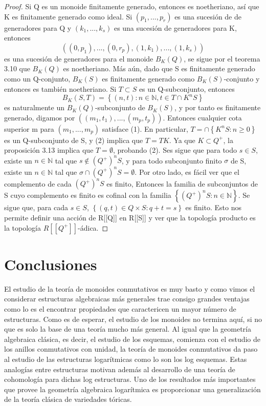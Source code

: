 \documentclass[12pt,spanish]{amsart}
\newcommand{\bb}[1]{\mathbb{#1}}
\newcommand{\set}[1]{\left\{{#1}\right\}}
\theoremstyle{definition}
\theoremstyle{remark}
\begin{document}
\begin{proof}
 Si Q es un monoide finitamente generado, entonces es noetheriano, así que K es finitamente generado como ideal. Si $(p_{1},...,p_{r})$ es una sucesión de de generadores para Q y $(k_{1},...,k_{s})$  es una sucesión de generadores para K, entonces
 $$((0,p_{1}),...,(0,r_{p}),(1,k_{1}),...,(1,k_{s}))$$
 es una sucesión de generadores para el monoide $B_{K}(Q)$, se sigue por el teorema 3.10 que $B_{K}(Q)$ es noetheriano. Más aún, dado que S es finitamente generado como un Q-conjunto, $B_{K}(S)$ es finitamente generado como $B_{K}(S)$-conjunto y entonces es también noetheriano. Si $T \subset S$ es un Q-subconjunto, entonces 
 $$B_{K}(S,T)=\set{(n,t):n\in  \bb{N}, t\in T \cap K^{n}S}$$
 es naturalmente un $B_{K}(Q)$-subconjunto de $B_{K}(S)$, y por tanto es finitamente generado, digamos por $((m_{1},t_{1}),...,(m_{p},t_{p}))$. Entonces cualquier cota superior m para $(m_{1},...,m_{p})$ satisface (1). En particular, $T=\cap \set{K^{n}S:n\geq 0}$ es un Q-subconjunto de S, y (2) implica que $T=TK$. Ya que $K\subset Q^{+}$, la proposición 3.13 implica que $T=\emptyset$, probando (2). Ses sigue que para todo $s\in S$, existe un $n\in \bb{N}$ tal que $s\notin (Q^{+})^{n}S$, y para todo subconjunto finito $\sigma$ de S, existe un $n\in \bb{N}$ tal que $\sigma \cap (Q^{+})^{n}S= \emptyset$. Por otro lado, es fácil ver que el complemento de cada $(Q^{+})^{n}S$ es finito, Entonces la familia de subconjuntos de S cuyo complemento es finito es cofinal con la familia $\set{(Q^{+})^{n}S:n\in \bb{N}}$. Se sigue que, para cada $s\in S$, $\set{(q,t)\in Q\times S:q+t=s}$ es finito. Esto nos permite definir una acción de R[[Q]] en R[[S]] y ver que la topología producto es la topología $R[[Q^{+}]]$-ádica. 
\end{proof}

\section{Conclusiones}

El estudio de la teoría de monoides conmutativos es muy basto y como vimos el considerar estructuras algebraicas más generales trae consigo grandes ventajas como lo es el encontrar propiedades que caractericen un mayor número de estructuras. Como es de esperar, el estudio de los monoides no termina aquí, si no que es solo la base de una teoría mucho más general. Al igual que la geometría algebraica clásica, es decir, el estudio de los esquemas, comienza con el estudio de los anillos conmutativos con unidad, la teoría de monoides conmutativos da paso al estudio de las estructuras logarítmicas como lo son los log esquemas.  Estas analogías entre estructuras motivan además al desarrollo de una teoría de cohomología para dichas log estructuras. Uno de los resultados más importantes que provee la geometría algebraica logarítmica es proporcionar una generalización de la teoría clásica de variedades tóricas.




\end{document}
